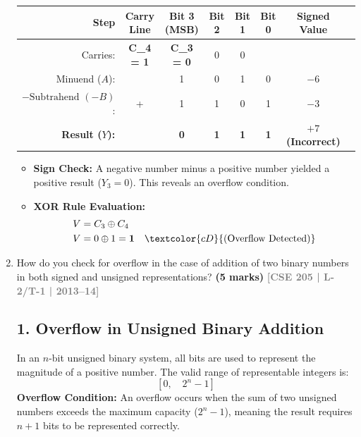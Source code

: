 \documentclass[12pt,a3paper]{article}
\newcommand{\yr}[1]{\hfill\textcolor{gray}{\small\textbf{[#1]}}}
\newcommand{\mk}[1]{\textcolor{orange!70!black}{\small\textbf{(#1 marks)}}}
\begin{document}
\begin{enumerate}
\begin{tcolorbox}[enhanced,breakable,ansbox,colback=cD!4,colframe=cD,boxrule=0.8pt,arc=5pt,title={\textbf{Answer}},fonttitle=\bfseries\color{white},colbacktitle=cD]
\begin{center}
\renewcommand{\arraystretch}{1.1}
\begin{tabular}{rccccccl}
\toprule
\textbf{Step} & \textbf{Carry Line} & \textbf{Bit 3 (MSB)} & \textbf{Bit 2} & \textbf{Bit 1} & \textbf{Bit 0} & \textbf{Signed Value} \\
\midrule
Carries: & \textcolor{cD}{\textbf{C\_4 = 1}} & \textcolor{cD}{\textbf{C\_3 = 0}} & 0 & 0 & & \\
Minuend ($A$): & & 1 & 0 & 1 & 0 & $-6$ \\
$- \text{Subtrahend } (-B)$: & + & 1 & 1 & 0 & 1 & $-3$ \\
\cmidrule{1-7}
\textbf{Result ($Y$):} & & \textbf{0} & \textbf{1} & \textbf{1} & \textbf{1} & \textbf{$+7$ (Incorrect)} \\
\bottomrule
\end{tabular}
\end{center}

\begin{itemize}
    \item \textbf{Sign Check:} A negative number minus a positive number yielded a positive result ($Y_3=0$). This reveals an overflow condition.
    \item \textbf{XOR Rule Evaluation:}
    \begin{align*}
        V &= C_3 \oplus C_4 \\
        V &= 0 \oplus 1 = \mathbf{1} \quad \textcolor{cD}{\text{(Overflow Detected)}}
    \end{align*}
\end{itemize}

\end{tcolorbox}

\item How do you check for overflow in the case of addition of two binary numbers in both signed and unsigned representations?
\mk{5} \yr{CSE 205 | L-2/T-1 | 2013--14}

\begin{tcolorbox}[enhanced,breakable,ansbox,colback=cD!4,colframe=cD,boxrule=0.8pt,arc=5pt,title={\textbf{Answer}},fonttitle=\bfseries\color{white},colbacktitle=cD]

\subsection*{1. Overflow in Unsigned Binary Addition}
In an $n$-bit unsigned binary system, all bits are used to represent the magnitude of a positive number. The valid range of representable integers is:
$$ [0, \quad 2^n - 1] $$
\textbf{Overflow Condition:} An overflow occurs when the sum of two unsigned numbers exceeds the maximum capacity ($2^n - 1$), meaning the result requires $n+1$ bits to be represented correctly.


\end{tcolorbox}
\end{enumerate}
\end{document}
